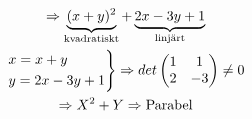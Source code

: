 \begin{equation*}
  \begin{gathered}
    \Rightarrow \underbrace{(x+y)^2}_{\text{kvadratiskt}}+\underbrace{2x-3y+1}_{\text{linjärt}}\\
    \begin{rcases*}
      x = x+y\\
      y = 2x-3y+1
    \end{rcases*}
    \Rightarrow det\begin{pmatrix}1&1\\2&-3\end{pmatrix}\neq0\\
    \Rightarrow X^2+Y \Rightarrow\text{Parabel}
  \end{gathered}
\end{equation*}

